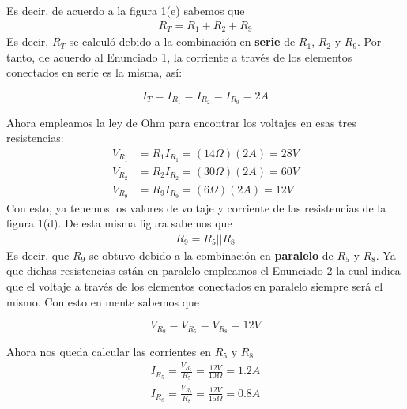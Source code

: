 \documentclass[12pt,a4paper]{article}
\begin{document}
	Es decir, de acuerdo a la figura 1(e) sabemos que 
	\begin{align}
		R_T = R_1 + R_2 + R_9\nonumber
	\end{align}
	Es decir, $R_T$ se calculó debido a la combinación en \textbf{serie} de $R_1$, $R_2$ y $R_9$. Por tanto, de acuerdo al Enunciado 1, la corriente a través de los elementos conectados en serie es la misma, así:
	
	\begin{tcolorbox}[colback=red!5!white,colframe=red!75!black,width=(\linewidth+0.45cm)]
		\begin{equation}
			I_T = I_{R_1} = I_{R_2} = I_{R_9} = 2A\nonumber
		\end{equation}
	\end{tcolorbox}

	Ahora empleamos la ley de Ohm para encontrar los voltajes en esas tres resistencias:
	\begin{align}
		V_{R_1} &= R_1 I_{R_1} = (14\Omega)(2A) = 28V\nonumber\\
		V_{R_2} &= R_2 I_{R_2} = (30\Omega)(2A) = 60V\nonumber\\
		V_{R_9} &= R_9 I_{R_9} = (6\Omega)(2A) = 12V\nonumber
	\end{align}
	Con esto, ya tenemos los valores de voltaje y corriente de las resistencias de la figura 1(d). De esta misma figura sabemos que 
	\begin{align}
		R_9 = R_5 || R_8\nonumber
	\end{align}
	Es decir, que $R_9$ se obtuvo debido a la combinación en \textbf{paralelo} de $R_5$ y $R_8$. Ya que dichas resistencias están en paralelo empleamos el Enunciado 2 la cual indica que el voltaje a través de los elementos conectados en paralelo siempre será el mismo. Con esto en mente sabemos que 
	
	\begin{tcolorbox}[colback=red!5!white,colframe=red!75!black,width=(\linewidth+0.45cm)]
		\begin{equation}
			V_{R_9} = V_{R_5} = V_{R_8} = 12V
		\end{equation}
	\end{tcolorbox}
	Ahora nos queda calcular las corrientes en $R_5$ y $R_8$
	\begin{align}
		I_{R_5} = \frac{V_{R_5}}{R_5} = \frac{12V}{10\Omega} = 1.2A\nonumber\\
		I_{R_8} = \frac{V_{R_8}}{R_8} = \frac{12V}{15\Omega} = 0.8A\nonumber
	\end{align}
\end{document}
